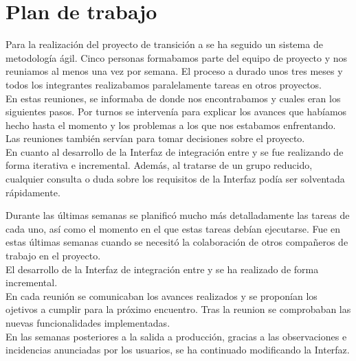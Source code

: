 \section{Plan de trabajo}

Para la realización del proyecto de transición a \wday{} se ha seguido un sistema de metodología ágil. 
Cinco personas formabamos parte del equipo de proyecto y nos reuniamos al menos una vez por semana.
El proceso a durado unos tres meses y todos los integrantes realizabamos paralelamente tareas en otros proyectos.\\

En estas reuniones, se informaba de donde nos encontrabamos y cuales eran los siguientes pasos.
Por turnos se intervenía para explicar los avances que habíamos hecho hasta el momento y los problemas a los que nos estabamos enfrentando.
Las reuniones también servían para tomar decisiones sobre el proyecto.\\

En cuanto al desarrollo de la Interfaz de integración entre \hs{} y \wday{} se fue realizando de forma iterativa e incremental. 
Además, al tratarse de un grupo reducido, cualquier consulta o duda sobre los requisitos de la Interfaz podía ser solventada rápidamente.

Durante las últimas semanas se planificó mucho más detalladamente las tareas de cada uno, así como el momento en el que estas tareas debían ejecutarse.
Fue en estas últimas semanas cuando se necesitó la colaboración de otros compañeros de trabajo en el proyecto.\\

El desarrollo de la Interfaz de integración entre \hs{} y \wday{} se ha realizado de forma incremental.\\

En cada reunión se comunicaban los avances realizados y se proponían los ojetivos a cumplir para la próximo encuentro. Tras la reunion se comprobaban las nuevas funcionalidades implementadas.\\

En las semanas posteriores a la salida a producción, gracias a las observaciones e incidencias anunciadas por los usuarios,
se ha continuado modificando la Interfaz. 
